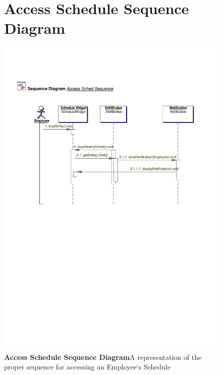\documentclass[letterpaper,12pt]{report}
\begin{document}
\begin{figure}[hbp]
 \section{Access Schedule Sequence Diagram}
 \includegraphics[scale=0.65]{externals/SequenceDiagrams1.pdf}
 \caption{\small
\textbf{Access Schedule Sequence Diagram}\newline A representation of the proper sequence for accessing an Employee`s Schedule}\label{fig:seqAccessSched}
\end{figure}
\newpage
\end{document}
